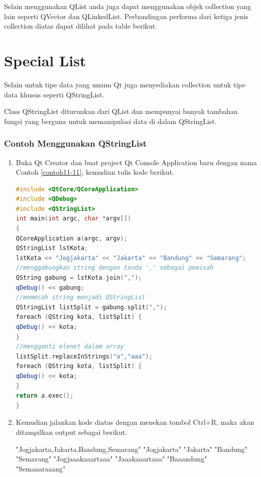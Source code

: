 Selain menggunakan QList anda juga dapat menggunakan objek collection
yang lain seperti QVector dan QLinkedList. Perbandingan performa dari
ketiga jenis collection diatas dapat dilihat pada table berikut.

\section{Special List}\label{special-list}

Selain untuk tipe data yang umum Qt juga menyediakan collection untuk
tipe data khusus seperti QStringList.

Class QStringList diturunkan dari QList dan mempunyai banyak tambahan
fungsi yang berguna untuk memanipulasi data di dalam QStringList.

\subsubsection*{Contoh Menggunakan QStringList}

\begin{enumerate}

\item
  Buka Qt Creator dan buat project Qt Console Application baru dengan
  nama Contoh \ref{contoh11-11}, kemudian tulis kode berikut.

\begin{lstlisting}[language=c++, caption=Menggunakan QStringList,label=contoh11-11]
#include <QtCore/QCoreApplication>
#include <QDebug>
#include <QStringList>
int main(int argc, char *argv[])
{
QCoreApplication a(argc, argv);
QStringList lstKota;
lstKota << "Jogjakarta" << "Jakarta" << "Bandung" << "Semarang";
//menggabungkan string dengan tanda ',' sebagai pemisah
QString gabung = lstKota.join(",");
qDebug() << gabung;
//memecah string menjadi QStringList
QStringList listSplit = gabung.split(",");
foreach (QString kota, listSplit) {
qDebug() << kota;
}
//mengganti elenet dalam array
listSplit.replaceInStrings("a","aaa");
foreach (QString kota, listSplit) {
qDebug() << kota;
}
return a.exec();
}
\end{lstlisting}
\item
  Kemudian jalankan kode diatas dengan menekan tombol Ctrl+R, maka akan
  ditampilkan output sebagai berikut.

\begin{lcverbatim}
"Jogjakarta,Jakarta,Bandung,Semarang"
"Jogjakarta"
"Jakarta"
"Bandung"
"Semarang"
"Jogjaaakaaartaaa"
"Jaaakaaartaaa"
"Baaandung"
"Semaaaraaang"
\end{lcverbatim}
\end{enumerate}

